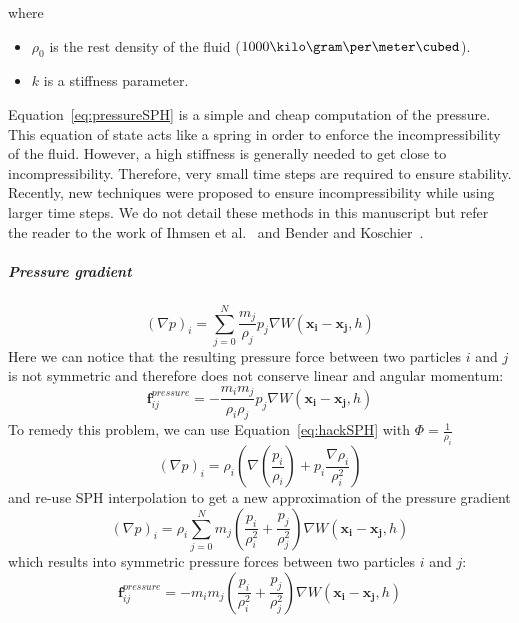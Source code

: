 where 
\begin{itemize}
\item $\rho_{0}$ is the rest density of the fluid ($1000\kilo\gram\per\meter\cubed$).
\item $k$ is a stiffness parameter.
\end{itemize}
Equation~\eqref{eq:pressureSPH} is a simple and cheap computation of the pressure. This equation of state acts like a spring in order to enforce the incompressibility of the fluid.
However, a high stiffness is generally needed to get close to incompressibility. Therefore, very small time steps are required to ensure stability. Recently, new techniques were proposed to ensure incompressibility while using larger time steps. We do not detail these methods in this manuscript but refer the reader to the work of Ihmsen et al.~\cite{Ihmsen2014:IISPH} and Bender and Koschier~\cite{Bender2015}.
\subparagraph{Pressure gradient}
\begin{equation}
\left(\nabla p\right)_{i} = \sum_{j=0}^{N} \frac{m_{j}}{\rho_{j}} p_{j} \nabla W(\mathbf{x_{i}}-\mathbf{x_{j}},h)
\end{equation}
Here we can notice that the resulting pressure force between two particles $i$ and $j$ is not symmetric and therefore does not conserve linear and angular momentum:
\begin{equation}
\label{eq:nonSymmetricPressureForce}
\mathbf{f}^{pressure}_{ij} = -\frac{m_{i}m_{j}}{\rho_{i}\rho_{j}}p_{j}\nabla W(\mathbf{x_{i}}-\mathbf{x_{j}},h)
\end{equation}
To remedy this problem, we can use Equation~\eqref{eq:hackSPH} with $\displaystyle \Phi = \frac{1}{\rho_{i}}$
\begin{equation}
\left(\nabla p\right)_{i} = \rho_{i} \left( \nabla \left(\frac{p_{i}}{\rho_{i}}\right) + p_{i}\frac{\nabla \rho_{i}}{\rho_{i}^{2}}\right)
\end{equation}
and re-use SPH interpolation to get a new approximation of the pressure gradient
\begin{equation}
\label{eq:pressureGradientSPH}
\left(\nabla p\right)_{i} = 
\rho_{i}
\sum_{j=0}^{N} m_{j} \left( \frac{p_{i}}{\rho_{i}^{2}} + \frac{p_{j}}{\rho_{j}^{2}} \right) \nabla W(\mathbf{x_{i}}-\mathbf{x_{j}},h)
\end{equation}
which results into symmetric pressure forces between two particles $i$ and $j$:
\begin{equation}
\label{eq:symmetricPressureForce}
\mathbf{f}^{pressure}_{ij} = 
-m_{i}m_{j}
\left( 
\frac{p_{i}}{\rho_{i}^{2}} + \frac{p_{j}}{\rho_{j}^{2}} 
\right) 
\nabla W(\mathbf{x_{i}}-\mathbf{x_{j}},h)
\end{equation}
